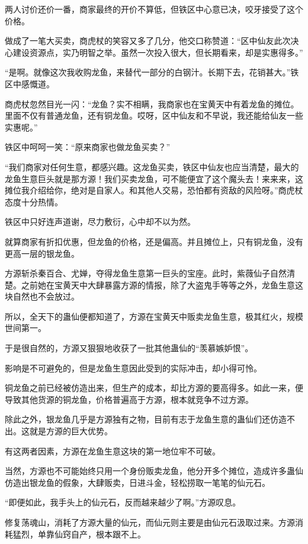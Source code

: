 \begin{this_body}
两人讨价还价一番，商家最终的开价不算低，但铁区中心意已决，咬牙接受了这个价格。

做成了一笔大买卖，商虎杖的笑容又多了几分，他交口称赞道：“区中仙友此次决心建设资源点，实乃明智之举。虽然一次投入很大，但长期看来，却是实惠得多。”

“是啊。就像这次我收购龙鱼，来替代一部分的白钢汁。长期下去，花销甚大。”铁区中感慨道。

商虎杖忽然目光一闪：“龙鱼？实不相瞒，我商家也在宝黄天中有着龙鱼的摊位。里面不仅有普通龙鱼，还有铜龙鱼。哎呀，区中仙友和不早说，我还能给仙友一些实惠呢。”

铁区中呵呵一笑：“原来商家也做龙鱼买卖？”

“我们商家对任何生意，都感兴趣。这龙鱼买卖，铁区中仙友也应当清楚，最大的龙鱼生意巨头就是那方源！我们买卖龙鱼，可不能便宜了这个魔头去！来来来，这摊位我介绍给你，绝对是自家人。和其他人交易，恐怕都有资敌的风险呀。”商虎杖态度十分热情。

铁区中只好连声道谢，尽力敷衍，心中却不以为然。

就算商家有折扣优惠，但龙鱼的价格，还是偏高。并且摊位上，只有铜龙鱼，没有更高一层的银龙鱼。

方源斩杀秦百合、尤婵，夺得龙鱼生意第一巨头的宝座。此时，紫薇仙子自然清楚。之前她在宝黄天中大肆暴露方源的情报，除了大盗鬼手等等之外，龙鱼生意这块自然也不会放过。

所以，全天下的蛊仙便都知道了，方源在宝黄天中贩卖龙鱼生意，极其红火，规模世间第一。

于是很自然的，方源又狠狠地收获了一批其他蛊仙的“羡慕嫉妒恨”。

影响是不可避免的，但是龙鱼生意因此受到的实际冲击，却小得可怜。

铜龙鱼之前已经被仿造出来，但生产的成本，却比方源的要高得多。如此一来，便导致其他货源的铜龙鱼，价格普遍高于方源，根本就竞争不过方源。

除此之外，银龙鱼几乎是方源独有之物，目前有志于龙鱼生意的蛊仙们还仿造不出。这就是方源的巨大优势。

有这两者因素，方源在龙鱼生意这块的第一地位牢不可破。

当然，方源也不可能始终只用一个身份贩卖龙鱼，他分开多个摊位，造成许多蛊仙仿造出银龙鱼的假象，大肆贩卖，日进斗金，轻松捞取一笔笔的仙元石。

“即便如此，我手头上的仙元石，反而越来越少了啊。”方源叹息。

修复荡魂山，消耗了方源大量的仙元，而仙元则主要是由仙元石汲取过来。方源消耗猛烈，单靠仙窍自产，根本跟不上。


\end{this_body}
